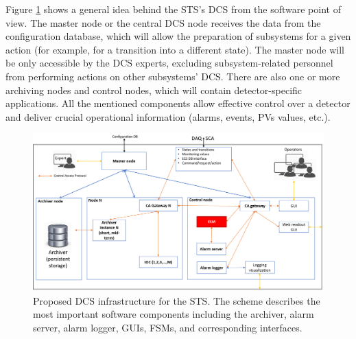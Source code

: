 Figure \ref{fig_arch} shows a general idea behind the \gls{STS}'s \gls{DCS} from the software point of view.  The master node or the central \gls{DCS} node receives the data from the configuration database, which will allow the preparation of subsystems for a given action (for example, for a transition into a different state). The master node will be only accessible by the \gls{DCS} experts, excluding subsystem-related personnel from performing actions on other subsystems' \gls{DCS}. There are also one or more archiving nodes and control nodes, which will contain detector-specific applications. All the mentioned components allow effective control over a detector and deliver crucial operational information (alarms, events, \glspl{PV} values, etc.). 

\begin{figure}[!h]
\centering
\includegraphics[width=1\columnwidth]{Chapter3/Controls/images/DCS.png}
\caption{Proposed \gls{DCS} infrastructure for the \gls{STS}. The scheme describes the most important software components including the archiver, alarm server, alarm logger, GUIs, \glspl{FSM}, and corresponding interfaces.}
\label{fig_arch}
\end{figure}
\newpage





